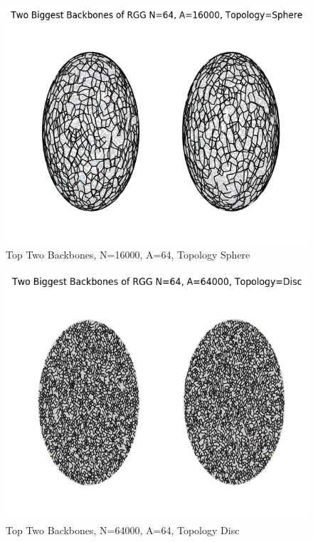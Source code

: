 \documentclass{article}
\begin{document}
    \begin{figure}
      \centering
      \label{backbone_64_16000_Sphere}
      \includegraphics[width=1 \textwidth]{backbone/backbone_64_16000_Sphere.png}
      \caption{Top Two Backbones, N=16000, A=64, Topology Sphere}
    \end{figure}

    \begin{figure}
      \centering
      \label{backbone_64_64000_Disc}
      \includegraphics[width=1 \textwidth]{backbone/backbone_64_64000_Disc.png}
      \caption{Top Two Backbones, N=64000, A=64, Topology Disc}
    \end{figure}
\end{document}
